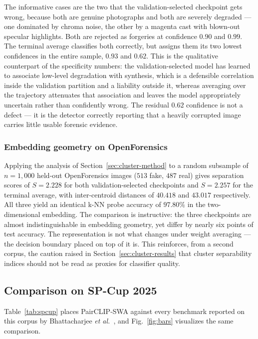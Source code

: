 \documentclass[10pt,journal]{IEEEtran}
\begin{document}
The informative cases are the two that the validation-selected checkpoint gets
wrong, because both are genuine photographs and both are severely degraded ---
one dominated by chroma noise, the other by a magenta cast with blown-out
specular highlights. Both are rejected as forgeries at confidence $0.90$ and
$0.99$. The terminal average classifies both correctly, but assigns them its
two lowest confidences in the entire sample, $0.93$ and $0.62$. This is the
qualitative counterpart of the specificity numbers: the validation-selected
model has learned to associate low-level degradation with synthesis, which is
a defensible correlation inside the validation partition and a liability
outside it, whereas averaging over the trajectory attenuates that association
and leaves the model appropriately uncertain rather than confidently wrong.
The residual $0.62$ confidence is not a defect --- it is the detector
correctly reporting that a heavily corrupted image carries little usable
forensic evidence.

\subsubsection{Embedding geometry on OpenForensics}
Applying the analysis of Section~\ref{sec:cluster-method} to a random
subsample of $n=1{,}000$ held-out OpenForensics images ($513$ fake, $487$
real) gives separation scores of $S=2.228$ for both validation-selected
checkpoints and $S=2.257$ for the terminal average, with inter-centroid
distances of $40.418$ and $43.017$ respectively. All three yield an identical
k-NN probe accuracy of $97.80\%$ in the two-dimensional embedding. The
comparison is instructive: the three checkpoints are almost indistinguishable
in embedding geometry, yet differ by nearly six points of test accuracy. The
representation is not what changes under weight averaging --- the decision
boundary placed on top of it is. This reinforces, from a second corpus, the
caution raised in Section~\ref{sec:cluster-results} that cluster separability
indices should not be read as proxies for classifier quality.

\subsection{Comparison on SP-Cup 2025}\label{sec:spcup}
Table~\ref{tab:spcup} places PairCLIP-SWA against every benchmark reported
on this corpus by Bhattacharjee \emph{et al.}~\cite{bhattacharjee2026caenet},
and Fig.~\ref{fig:bars} visualizes the same comparison.
\end{document}
